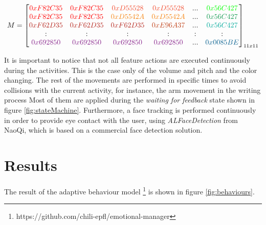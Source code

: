 \begin{equation}\label{eq:matrices}
M =  \begin{bmatrix} 
		\textcolor{red}{0xF82C35} & \textcolor{red}{0xF82C35} & \textcolor{RedOrange}{0xD55528} & \textcolor{RedOrange}{0xD55528} & ... & \textcolor{green}{0x56C427}  \\
		\textcolor{red}{0xF82C35} & \textcolor{red}{0xF82C35} & \textcolor{BurntOrange}{0xD5542A} & \textcolor{BurntOrange}{0xD5542A} & ... & \textcolor{ForestGreen}{0x56C427}  \\
		\textcolor{BrickRed}{0xF62D35} & \textcolor{BrickRed}{0xF62D35} & \textcolor{BrickRed}{0xF62D35} & \textcolor{Bittersweet}{0xE96A37} & ... & \textcolor{JungleGreen}{0x56C427}  \\
			:	 &	:		&		:  &		: & :   & 		: 	  \\
		\textcolor{Fuchsia}{0x692850} & \textcolor{Fuchsia}{0x692850} & \textcolor{Fuchsia}{0x692850} & \textcolor{Fuchsia}{0x692850} & ... & \textcolor{MidnightBlue}{0x0085BE}		
	 \end{bmatrix}_{11x11}
\end{equation}

\vspace{0.5cm}

It is important to notice that not all feature actions are executed continuously during the activities. This is the case only of the volume and pitch and the color changing. The rest of the movements are performed in specific times to avoid collisions with the current activity, for instance, the arm movement in the writing process  Most of them are applied during the \textit{waiting for feedback} state shown in figure \ref{fig:stateMachine}. Furthermore, a face tracking is performed continuously in order to provide eye contact with the user, using \textit{ALFaceDetection} from NaoQi, which is based on a commercial face detection solution.

\section{Results}
The result of the adaptive behaviour model \footnote{https://github.com/chili-epfl/emotional-manager} is shown in figure \ref{fig:behaviours}. 

